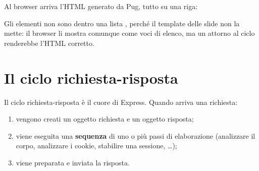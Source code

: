 Al browser arriva l'HTML generato da Pug, tutto su una riga:


Gli elementi  non sono dentro una lista , perché il template
delle slide non la mette: il browser li mostra comunque come voci di elenco, ma
un  attorno al ciclo  renderebbe l'HTML corretto.

\section{Il ciclo richiesta-risposta}

Il ciclo richiesta-risposta è il cuore di Express. Quando arriva una richiesta:

\begin{enumerate}
  \item vengono creati un oggetto richiesta e un oggetto risposta;
  \item viene eseguita una \textbf{sequenza} di uno o più passi di elaborazione
        (analizzare il corpo, analizzare i cookie, stabilire una sessione,
        \ldots);
  \item viene preparata e inviata la risposta.
\end{enumerate}

